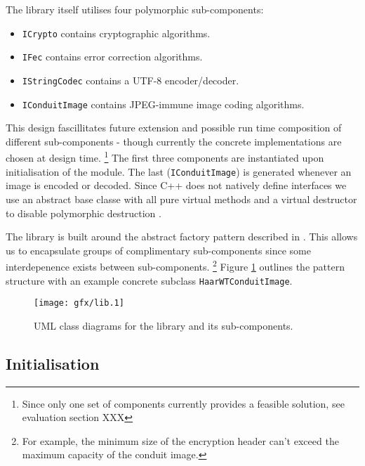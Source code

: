     The library itself utilises four polymorphic sub-components:
    
    \begin{itemize}
    
        \item {\tt ICrypto} contains cryptographic algorithms.
        \item {\tt IFec} contains error correction algorithms.
        \item {\tt IStringCodec} contains a UTF-8 encoder/decoder.
        \item {\tt IConduitImage} contains JPEG-immune image coding algorithms.
    
    \end{itemize}
    
    This design fascillitates future extension and possible run time composition of different sub-components - though currently the concrete implementations are chosen at design time. \footnote{Since only one set of components currently provides a feasible solution, see evaluation section XXX} The first three components are instantiated upon initialisation of the module. The last ({\tt IConduitImage}) is generated whenever an image is encoded or decoded. Since C++ does not natively define interfaces we use an abstract base classe with all pure virtual methods and a virtual destructor to disable polymorphic destruction \cite{interfaces}. 
    
    The library is built around the abstract factory pattern described in \cite{dpatterns}. This allows us to encapsulate groups of complimentary sub-components since some interdepenence exists between sub-components. \footnote{For example, the minimum size of the encryption header can't exceed the maximum capacity of the conduit image.} Figure \ref{uml:lib-classes} outlines the pattern structure with an example concrete subclass {\tt HaarWTConduitImage}.
    
    \begin{figure}[tb]
        \begin{center}
                \texttt{[image: gfx/lib.1]}
            \caption{UML class diagrams for the library and its sub-components.}
            \label{uml:lib-classes}
        \end{center}
    \end{figure}
    
    
\subsection{Initialisation}

